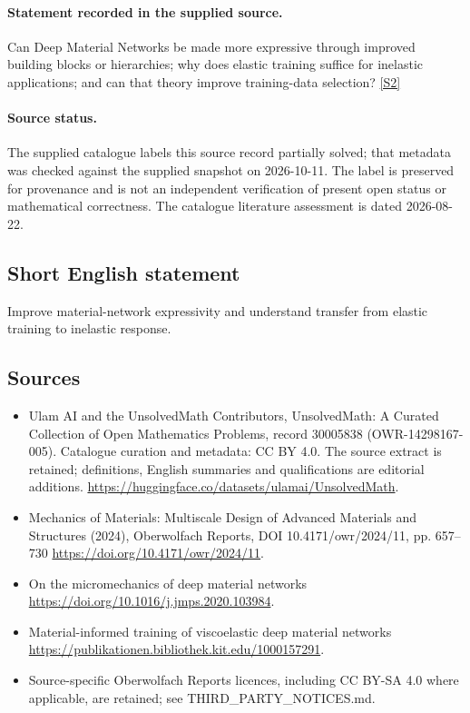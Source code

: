 \documentclass[11pt]{article}
\begin{document}
\paragraph{Statement recorded in the supplied source.}
Can Deep Material Networks be made more expressive through improved building blocks or hierarchies; why does elastic training suffice for inelastic applications; and can that theory improve training-data selection? \href{https://doi.org/10.4171/owr/2024/11}{[S2]}
\paragraph{Source status.}
The supplied catalogue labels this source record partially solved; that metadata was checked against the supplied snapshot on 2026-10-11. The label is preserved for provenance and is not an independent verification of present open status or mathematical correctness. The catalogue literature assessment is dated 2026-08-22.
\subsection{Short English statement}
Improve material-network expressivity and understand transfer from elastic training to inelastic response.
\subsection{Sources}
\begin{itemize}
\item[S1] Ulam AI and the UnsolvedMath Contributors, UnsolvedMath: A Curated Collection of Open Mathematics Problems, record 30005838 (OWR-14298167-005). Catalogue curation and metadata: CC BY 4.0. The source extract is retained; definitions, English summaries and qualifications are editorial additions.
\url{https://huggingface.co/datasets/ulamai/UnsolvedMath}.
\item[S2] Mechanics of Materials: Multiscale Design of Advanced Materials and Structures (2024), Oberwolfach Reports, DOI 10.4171/owr/2024/11, pp. 657--730
\url{https://doi.org/10.4171/owr/2024/11}.
\item[S3] On the micromechanics of deep material networks
\url{https://doi.org/10.1016/j.jmps.2020.103984}.
\item[S4] Material-informed training of viscoelastic deep material networks
\url{https://publikationen.bibliothek.kit.edu/1000157291}.
\item Source-specific Oberwolfach Reports licences, including CC BY-SA 4.0 where applicable, are retained; see THIRD\_PARTY\_NOTICES.md.
\end{itemize}
\end{document}
